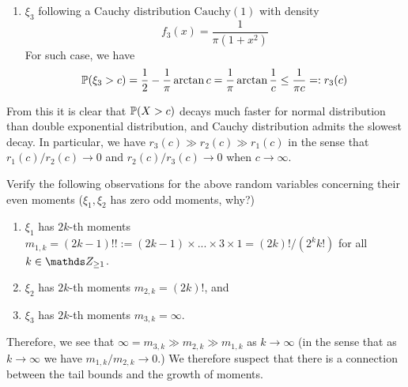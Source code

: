 {\begin{example}
\begin{enumerate}
    \item $\xi_3$ following a Cauchy distribution $\text{Cauchy}(1)$ with density
    \begin{equation*}
        f_3(x) = \frac{1}{\pi (1+x^2)}
    \end{equation*}
    For such case, we have
    \begin{align*}
        \mathbb{P}(\xi_3 > c) = \frac{1}{2} - \frac{1}{\pi} \arctan{c} = \frac{1}{\pi} \arctan{\frac{1}{c}} \leq \frac{1}{\pi c} =: r_3(c)
    \end{align*}
\end{enumerate}
From this it is clear that $\mathbb{P}(X > c)$ decays much faster for normal distribution than double exponential distribution, and Cauchy distribution admits the slowest decay. In particular, we have $r_3(c) \gg r_2(c) \gg r_1(c)$ in the sense that $r_1(c)/r_2(c) \to 0$ and $r_2(c)/r_3(c) \to 0$ when $c \to \infty$.\\
\end{example}

\begin{exercise} Verify the following observations for the above random variables concerning their even moments ($\xi_1, \xi_2$ has zero odd moments, why?)
\begin{enumerate}
    \item $\xi_1$ has $2k$-th moments $m_{1,k} = (2k-1)!! := (2k-1) \times ... \times 3 \times 1 = (2k)!/(2^k k!)$ for all $k \in \Z_{\geq 1}$.
    \item $\xi_2$ has $2k$-th moments $m_{2,k} = (2k)!$, and
    \item $\xi_3$ has $2k$-th moments $m_{3,k} = \infty$.
\end{enumerate}

Therefore, we see that $\infty = m_{3,k} \gg m_{2,k} \gg m_{1,k}$ as $k \to \infty$ (in the sense that as $k \to \infty$ we have $m_{1,k}/m_{2,k} \to 0$.) We therefore suspect that there is a connection between the tail bounds and the growth of moments. 
\end{exercise}}

